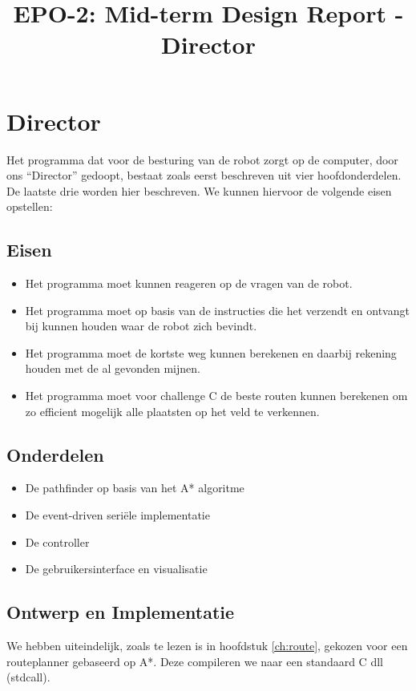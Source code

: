 \documentclass{report}
\title{EPO-2: Mid-term Design Report - Director}
\author{}
\begin{document}
\chapter{Director}
\label{ch:director}
Het programma dat voor de besturing van de robot zorgt op de computer, door ons ``Director'' gedoopt, bestaat zoals eerst beschreven uit vier hoofdonderdelen. De laatste drie worden hier beschreven. We kunnen hiervoor de volgende eisen opstellen:

\section{Eisen}
\label{sec:dirEisen}
\begin{itemize}
\item Het programma moet kunnen reageren op de vragen van de robot.
\item Het programma moet op basis van de instructies die het verzendt en ontvangt bij kunnen houden waar de robot zich bevindt.
\item Het programma moet de kortste weg kunnen berekenen en daarbij rekening houden met de al gevonden mijnen.
\item Het programma moet voor challenge C de beste routen kunnen berekenen om zo efficient mogelijk alle plaatsten op het veld te verkennen.
\end{itemize}

\section{Onderdelen}
\label{sec:dirOnderdelen}
\begin{itemize}
\item De pathfinder op basis van het A* algoritme
\item De event-driven seriële implementatie
\item De controller
\item De gebruikersinterface en visualisatie
\end{itemize}

\section{Ontwerp en Implementatie}
\label{sec:dirImplementatie}
We hebben uiteindelijk, zoals te lezen is in hoofdstuk \ref{ch:route}, gekozen voor een routeplanner gebaseerd op A*. Deze compileren we naar een standaard C dll (stdcall).
\end{document}
